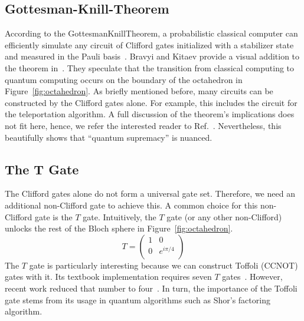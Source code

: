 \subsection{Gottesman-Knill-Theorem}

According to the Gottesman\hyph{}Knill\hyph{}Theorem, a probabilistic classical computer can efficiently simulate any circuit of Clifford gates initialized with a stabilizer state and measured in the Pauli basis~\cite{gottesman_heisenberg_1998}. Bravyi and Kitaev provide a visual addition to the theorem in~\cite{bravyi_universal_2005}. They speculate that the transition from classical computing to quantum computing occurs on the boundary of the octahedron in Figure~\ref{fig:octahedron}. As briefly mentioned before, many circuits can be constructed by the Clifford gates alone. For example, this includes the circuit for the teleportation algorithm. A full discussion of the theorem's implications does not fit here, hence, we refer the interested reader to Ref.~\cite{cuffaro_significance_2017}. Nevertheless, this beautifully shows that ``quantum supremacy'' is nuanced.


\subsection{The T Gate}

The Clifford gates alone do not form a universal gate set. Therefore, we need an additional non-Clifford gate to achieve this. A common choice for this non-Clifford gate is the $T$ gate. Intuitively, the $T$ gate (or any other non-Clifford) unlocks the rest of the Bloch sphere in Figure~\ref{fig:octahedron}. 
\begin{equation}
    T = \begin{pmatrix}
        1 & 0 \\
        0 & e^{i\pi{}/4} \\
    \end{pmatrix}
\end{equation}
The $T$ gate is particularly interesting because we can construct Toffoli (CCNOT) gates with it. Its textbook implementation requires seven $T$ gates~\cite{nielsen00}. However, recent work reduced that number to four~\cite{jones_novel_2013}. In turn, the importance of the Toffoli gate stems from its usage in quantum algorithms such as Shor's factoring algorithm.